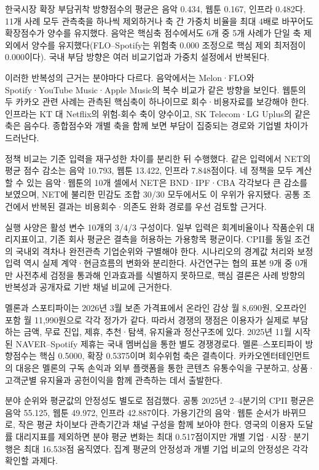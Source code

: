 \documentclass[11pt,a4paper]{report}
\begin{document}
한국시장 확장 부담귀착 방향점수의 평균은 음악 0.434, 웹툰 0.167, 인프라 0.482다. 11개 사례 모두 관측축을 하나씩 제외하거나 축 간 가중치 비율을 최대 4배로 바꾸어도 확장점수가 양수를 유지했다. 음악은 핵심축 점수에서도 6개 중 5개 사례가 단일 축 제외에서 양수를 유지했다(FLO--Spotify는 위험축 0.000 조정으로 핵심 제외 최저점이 0.000이다). 국내 부담 방향은 여러 비교기업과 가중치 설정에서 반복된다.

이러한 반복성의 근거는 분야마다 다르다. 음악에서는 Melon·FLO와 Spotify·YouTube Music·Apple Music의 복수 비교가 같은 방향을 보인다. 웹툰의 두 카카오 관련 사례는 관측된 핵심축이 하나이므로 회수·비용자료를 보강해야 한다. 인프라는 KT 대 Netflix의 위험-회수 축이 양수이고, SK Telecom·LG Uplus의 같은 축은 음수다. 종합점수와 개별 축을 함께 보면 부담이 집중되는 경로와 기업별 차이가 드러난다.

정책 비교는 기준 입력을 재구성한 차이를 분리한 뒤 수행했다. 같은 입력에서 NET의 평균 점수 감소는 음악 10.793, 웹툰 13.422, 인프라 7.848점이다. 네 정책을 모두 계산할 수 있는 음악·웹툰의 10개 셀에서 NET은 BND·IPF·CBA 각각보다 큰 감소를 보였으며, NET에 불리한 민감도 조합 30/30 모두에서도 이 우위가 유지됐다. 공통 조건에서 반복된 결과는 비용회수·의존도 완화 경로를 우선 검토할 근거다.

실행 사양은 활성 변수 10개의 3/4/3 구성이다. 일부 입력은 회계비율이나 작품순위 대리지표이고, 기존 회사 평균은 결측을 허용하는 가용항목 평균이다. CPII를 동일 조건의 국내외 격차나 완전관측 기업순위와 구별해야 한다. 시나리오의 경계값 처리와 보정 입력 역시 실제 계약·현금흐름의 변화와 분리한다. 사건연구는 협의 표본 9개 중 0개만 사전추세 검정을 통과해 인과효과를 식별하지 못하므로, 핵심 결론은 사례 방향의 반복성과 공개자료 기반 채널 비교에 근거한다.

\begin{ReportCallout}
멜론과 스포티파이는 2026년 3월 보존 가격표에서 온라인 감상 월 8,690원, 오프라인 포함 월 11,990원으로 각각 정가가 같다. 따라서 경쟁의 쟁점은 이용자가 실제로 부담하는 금액, 무료 진입, 제휴, 추천·탐색, 유지율과 정산구조에 있다. 2025년 11월 시작된 NAVER--Spotify 제휴는 국내 멤버십을 통한 별도 경쟁경로다. 멜론--스포티파이 방향점수는 핵심 0.5000, 확장 0.5375이며 회수위험 축은 결측이다. 카카오엔터테인먼트의 대응은 멜론의 구독 손익과 외부 플랫폼을 통한 콘텐츠 유통수익을 구분하고, 상품·고객군별 유지율과 공헌이익을 함께 관측하는 데서 출발한다.
\end{ReportCallout}

분야 순위와 평균값의 안정성도 별도로 점검했다. 공통 2025년 2--4분기의 CPII 평균은 음악 55.125, 웹툰 49.972, 인프라 42.887이다. 가용기간의 음악·웹툰 순서가 바뀌므로, 작은 평균 차이보다 관측기간과 채널 구성을 함께 보아야 한다. 영국의 이용자 도달률 대리지표를 제외하면 분야 평균 변화는 최대 0.517점이지만 개별 기업·시장·분기 행은 최대 16.538점 움직였다. 집계 평균의 안정성과 개별 기업 비교의 안정성은 각각 확인할 과제다.
\end{document}
